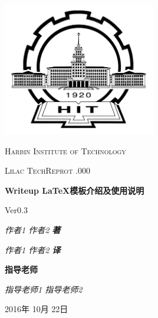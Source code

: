 \documentclass[a4paper,UTF8]{ctexart}
\begin{document}
\newcommand{\pubno}{000}    %
\newcommand{\pubtitle}{Writeup \LaTeX  模板介绍及使用说明\par Ver0.3 }
\newcommand{\pubyear}{2016} %
\newcommand{\pubmonth}{10}  %
\newcommand{\pubday}{22}    %

\begin{titlepage}
	\centering
	\par\vspace{5cm}\par
 	\includegraphics[width=0.5\textwidth]{hit_logo}
	\par\vspace{1cm}
	{\scshape\LARGE Harbin Institute of Technology\par}
	\vspace{1cm}
	{\scshape\Large Lilac TechReprot  \textnumero .\pubno\par}
	\vspace{1.5cm}
	{\huge\bfseries \pubtitle \par}
	\vspace{2cm}
	
	{\Large\itshape 作者1 \: 作者2 \quad  \bfseries 著\par}
	{\Large\itshape 作者1 \: 作者2 \quad \bfseries 译\par}
	\vfill
	{\bfseries 指导老师}\par
	{\itshape 指导老师1 \: 指导老师2}

	\vfill
	{\large \pubyear 年 \pubmonth 月 \pubday 日\par}
\end{titlepage}
\end{document}
